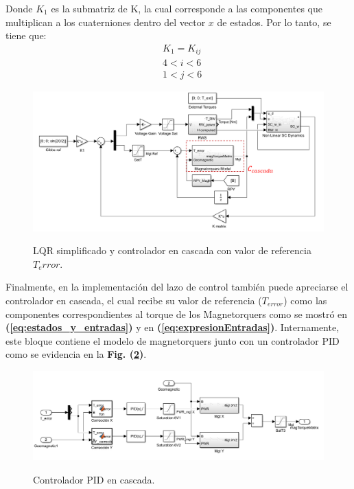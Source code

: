 Donde $K_1$ es la submatriz de K, la cual corresponde a las componentes que multiplican a los cuaterniones dentro del vector $x$ de estados. Por lo tanto, se tiene que: 
\begin{equation}
	\begin{aligned}
		&K_1= K_{ij}\\ 
		&4<i<6\\
		&1<j<6 		
	\end{aligned}	
\end{equation}
\newpage
\begin{figure}[!ht]
	\begin{center}
		\includegraphics[scale=0.6]{imagenes/controladores/lqr.PNG}\\
	\end{center}
	\caption{LQR simplificado y controlador en cascada con valor de referencia $T_error$.}
	\label{fig:lqr}	 	
\end{figure}

 Finalmente, en la implementación del lazo de control también puede apreciarse el controlador en cascada, el cual recibe su valor de referencia ($T_{error}$) como las componentes correspondientes al torque de los Magnetorquers como se mostró en \textbf{(\ref{eq:estados_y_entradas})} y en \textbf{(\ref{eq:expresionEntradas})}. Internamente, este bloque contiene el modelo de magnetorquers junto con un controlador PID como se evidencia en la \textbf{Fig. (\ref{fig:lqr_cascada})}.
 
\begin{figure}[!ht]
	\begin{center}
		\includegraphics[scale=0.45]{imagenes/controladores/cascada.PNG}\\
	\end{center}
	\caption{Controlador PID en cascada.}
	\label{fig:lqr_cascada}	 	
\end{figure}
\newpage

